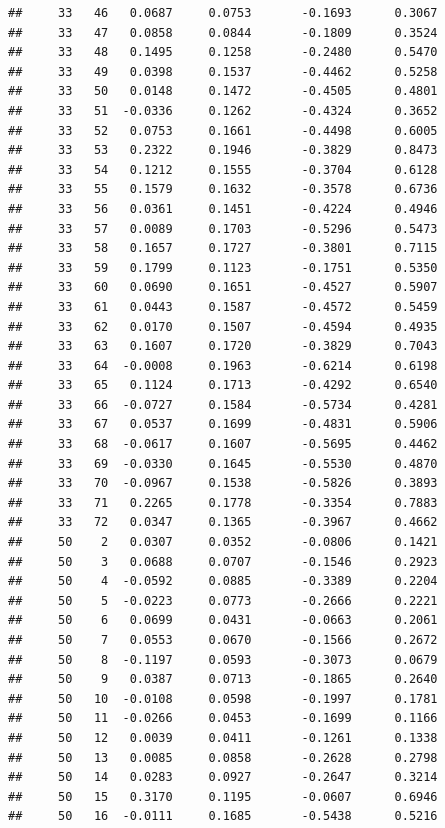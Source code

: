 \documentclass[
]{article}
\begin{document}
\begin{verbatim}
##     33   46   0.0687     0.0753       -0.1693      0.3067  
##     33   47   0.0858     0.0844       -0.1809      0.3524  
##     33   48   0.1495     0.1258       -0.2480      0.5470  
##     33   49   0.0398     0.1537       -0.4462      0.5258  
##     33   50   0.0148     0.1472       -0.4505      0.4801  
##     33   51  -0.0336     0.1262       -0.4324      0.3652  
##     33   52   0.0753     0.1661       -0.4498      0.6005  
##     33   53   0.2322     0.1946       -0.3829      0.8473  
##     33   54   0.1212     0.1555       -0.3704      0.6128  
##     33   55   0.1579     0.1632       -0.3578      0.6736  
##     33   56   0.0361     0.1451       -0.4224      0.4946  
##     33   57   0.0089     0.1703       -0.5296      0.5473  
##     33   58   0.1657     0.1727       -0.3801      0.7115  
##     33   59   0.1799     0.1123       -0.1751      0.5350  
##     33   60   0.0690     0.1651       -0.4527      0.5907  
##     33   61   0.0443     0.1587       -0.4572      0.5459  
##     33   62   0.0170     0.1507       -0.4594      0.4935  
##     33   63   0.1607     0.1720       -0.3829      0.7043  
##     33   64  -0.0008     0.1963       -0.6214      0.6198  
##     33   65   0.1124     0.1713       -0.4292      0.6540  
##     33   66  -0.0727     0.1584       -0.5734      0.4281  
##     33   67   0.0537     0.1699       -0.4831      0.5906  
##     33   68  -0.0617     0.1607       -0.5695      0.4462  
##     33   69  -0.0330     0.1645       -0.5530      0.4870  
##     33   70  -0.0967     0.1538       -0.5826      0.3893  
##     33   71   0.2265     0.1778       -0.3354      0.7883  
##     33   72   0.0347     0.1365       -0.3967      0.4662  
##     50    2   0.0307     0.0352       -0.0806      0.1421  
##     50    3   0.0688     0.0707       -0.1546      0.2923  
##     50    4  -0.0592     0.0885       -0.3389      0.2204  
##     50    5  -0.0223     0.0773       -0.2666      0.2221  
##     50    6   0.0699     0.0431       -0.0663      0.2061  
##     50    7   0.0553     0.0670       -0.1566      0.2672  
##     50    8  -0.1197     0.0593       -0.3073      0.0679  
##     50    9   0.0387     0.0713       -0.1865      0.2640  
##     50   10  -0.0108     0.0598       -0.1997      0.1781  
##     50   11  -0.0266     0.0453       -0.1699      0.1166  
##     50   12   0.0039     0.0411       -0.1261      0.1338  
##     50   13   0.0085     0.0858       -0.2628      0.2798  
##     50   14   0.0283     0.0927       -0.2647      0.3214  
##     50   15   0.3170     0.1195       -0.0607      0.6946  
##     50   16  -0.0111     0.1685       -0.5438      0.5216  

\end{verbatim}
\end{document}
